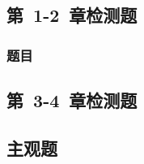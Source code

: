 \documentclass[color=blue]{textbook-cn}%
\begin{document}
\begin{Test}
\chapter{第~1-2~章检测题}
\lipsum\lipsum\cite{7}\cite{6}
\subsection{题目}
\end{Test}

\begin{Quiz}
\chapter{第~3-4~章检测题}
\section{主观题}
\lipsum[1-5]
\end{Quiz}



\tcbstoprecording
\end{document}
